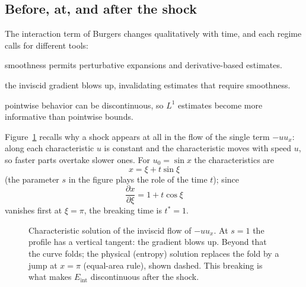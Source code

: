 \documentclass[11pt]{article}
\theoremstyle{plain}
\theoremstyle{definition}
\theoremstyle{remark}
\newcommand{\Eint}{E_{\mathrm{int}}}        %
\begin{document}
\subsection{Before, at, and after the shock}
The interaction term of Burgers changes qualitatively with time, and each regime calls for different tools:
\begin{description}[nosep,leftmargin=3.2cm,labelwidth=3.0cm]
\item[Before shock formation] smoothness permits perturbative expansions and derivative-based estimates.
\item[At breaking] the inviscid gradient blows up, invalidating estimates that require smoothness.
\item[After shock formation] pointwise behavior can be discontinuous, so $L^1$ estimates become more informative than pointwise bounds.
\end{description}
Figure~\ref{fig:burgers} recalls why a shock appears at all in the flow of the single term $-uu_x$: along each characteristic $u$ is constant and the characteristic moves with speed $u$, so faster parts overtake slower ones. For $u_0=\sin x$ the characteristics are
\[
x=\xi+t\sin\xi
\]
(the parameter $s$ in the figure plays the role of the time $t$); since
\[
\frac{\partial x}{\partial\xi}=1+t\cos\xi
\]
vanishes first at $\xi=\pi$, the breaking time is $t^*=1$.
\begin{figure}[!htb]
\centering
{}
\caption{Characteristic solution of the inviscid flow of $-uu_x$. At $s=1$ the profile has a vertical tangent: the gradient blows up. Beyond that the curve folds; the physical (entropy) solution replaces the fold by a jump at $x=\pi$ (equal-area rule), shown dashed. This breaking is what makes $\Eint$ discontinuous after the shock.}\label{fig:burgers}
\end{figure}
\end{document}
